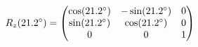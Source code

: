 \documentclass[preview]{standalone}
\begin{document}
\begin{align*}
\special{dvisvgm:raw <g id='unique000'>}R_z(21.2^\circ) = \begin{pmatrix} \cos(21.2^\circ) & -\sin(21.2^\circ) & 0 \\ \sin(21.2^\circ) & \cos(21.2^\circ) & 0 \\ 0 & 0 & 1 \end{pmatrix}\special{dvisvgm:raw </g>}
\end{align*}
\end{document}
